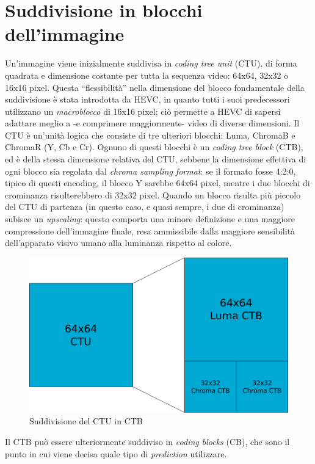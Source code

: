 \section{Suddivisione in blocchi dell'immagine} 
Un'immagine viene inizialmente suddivisa in \emph{coding tree unit} (CTU), di 
forma quadrata e dimensione costante per tutta la sequenza video: 64x64, 32x32 
o 16x16 pixel. Questa ``flessibilità'' nella dimensione del blocco fondamentale 
della suddivisione è stata introdotta da HEVC, in quanto tutti i suoi 
predecessori utilizzano un \emph{macroblocco} di 16x16 pixel; ciò permette a 
HEVC di sapersi adattare meglio a -e comprimere maggiormente- video di diverse 
dimensioni.
Il CTU è un'unità logica che consiste di tre ulteriori blocchi: Luma, 
ChromaB e ChromaR (Y, Cb e Cr). Ognuno di questi blocchi è un 
\emph{coding tree block} (CTB), ed è della stessa dimensione relativa 
del CTU, sebbene la dimensione effettiva di ogni blocco sia regolata dal 
\emph{chroma sampling format}: se il formato fosse 4:2:0, tipico di questi 
encoding, il blocco Y sarebbe 64x64 pixel, mentre i due blocchi di crominanza 
risulterebbero di 32x32 pixel. Quando un blocco risulta più piccolo del 
CTU di partenza (in questo caso, e quasi sempre, i due di crominanza) 
subisce un \emph{upscaling}: questo comporta una minore definizione e una 
maggiore compressione dell'immagine finale, resa ammissibile dalla maggiore 
sensibilità dell'apparato visivo umano alla luminanza rispetto al colore.
\begin{figure}[H]
  \centering
    \includegraphics[scale=0.35]{Figures/CTU-CTB}
  \caption{Suddivisione del CTU in CTB}
\end{figure}
Il CTB può essere ulteriormente suddiviso in \emph{coding blocks} (CB), che 
sono il punto in cui viene decisa quale tipo di \emph{prediction} utilizzare.
